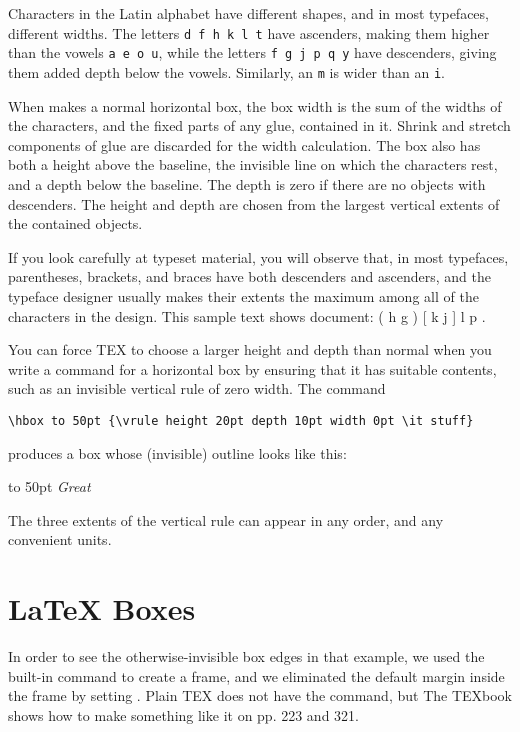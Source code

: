 {Characters in the Latin alphabet have different shapes, and in most typefaces,
different widths. The letters \texttt{d f h k l t} have ascenders, making them
higher than the vowels \texttt{a e o u}, while the letters \texttt{f g j p q y} have descenders,
giving them added depth below the vowels. Similarly, an \texttt{m} is wider than
an \texttt{i}. 

When \tex makes a normal horizontal box, the box width is the sum
of the widths of the characters, and the fixed parts of any glue, contained
in it. Shrink and stretch components of glue are discarded for the width
calculation. The box also has both a height above the baseline, the invisible
line on which the characters rest, and a depth below the baseline. The
depth is zero if there are no objects with descenders. The height and depth
are chosen from the largest vertical extents of the contained objects.

If you look carefully at typeset material, you will observe that, in most
typefaces, parentheses, brackets, and braces have both descenders and ascenders,
and the typeface designer usually makes their extents the maximum
among all of the characters in the design. This sample text shows
document: ( h g ) [ k j ] { l p }.

You can force TEX to choose a larger height and depth than normal when
you write a command for a horizontal box by ensuring that it has suitable
contents, such as an invisible vertical rule of zero width. The command

\verb+\hbox to 50pt {\vrule height 20pt depth 10pt width 0pt \it stuff}+

produces a box whose (invisible) outline looks like this: 

\hbox to 50pt {\vrule height 20pt depth 10pt width 0pt \it Great}

\noindent{}




The
three extents of the vertical rule can appear in any order, and any convenient
units.

\section{LaTeX Boxes}
In order to see the otherwise-invisible box edges in that example, we
used the \latex  built-in command  to create a frame, and we eliminated
the default margin inside the frame by setting . Plain TEX
does not have the  command, but The TEXbook shows how to make
something like it on pp. 223 and 321.

}
